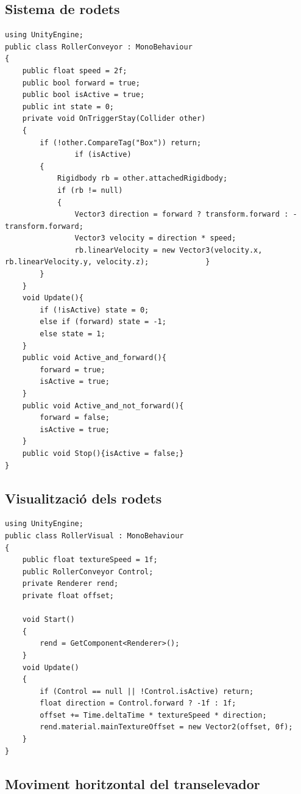 \documentclass[a4paper,11pt,DIV=13,headings=normal,abstract=true,twoside=semi]{article}
\begin{document}
\subsection*{Sistema de rodets}

\begin{lstlisting}[style=modern, caption={Controlador de rodets}, label={lst:rollerconveyor}]
using UnityEngine;
public class RollerConveyor : MonoBehaviour
{
    public float speed = 2f; 
    public bool forward = true; 
    public bool isActive = true;
    public int state = 0; 
    private void OnTriggerStay(Collider other)
    {
        if (!other.CompareTag("Box")) return;
                if (isActive)
        {
            Rigidbody rb = other.attachedRigidbody;
            if (rb != null)
            {
                Vector3 direction = forward ? transform.forward : -transform.forward;
                Vector3 velocity = direction * speed;
                rb.linearVelocity = new Vector3(velocity.x, rb.linearVelocity.y, velocity.z);             }
        }
    }
    void Update(){
        if (!isActive) state = 0;
        else if (forward) state = -1;
        else state = 1;
    }
    public void Active_and_forward(){
        forward = true;
        isActive = true;
    } 
    public void Active_and_not_forward(){
        forward = false;
        isActive = true;
    } 
    public void Stop(){isActive = false;}
}
\end{lstlisting}

\subsection*{Visualització dels rodets}

\begin{lstlisting}[style=modern, caption={Visualització de rodets}, label={lst:rollervisual}]
using UnityEngine;
public class RollerVisual : MonoBehaviour
{
    public float textureSpeed = 1f;
    public RollerConveyor Control;
    private Renderer rend;
    private float offset;

    void Start()
    {
        rend = GetComponent<Renderer>();
    }
    void Update()
    {
        if (Control == null || !Control.isActive) return;
        float direction = Control.forward ? -1f : 1f;
        offset += Time.deltaTime * textureSpeed * direction;
        rend.material.mainTextureOffset = new Vector2(offset, 0f);
    }
}
\end{lstlisting}

\subsection*{Moviment horitzontal del transelevador}
\end{document}
